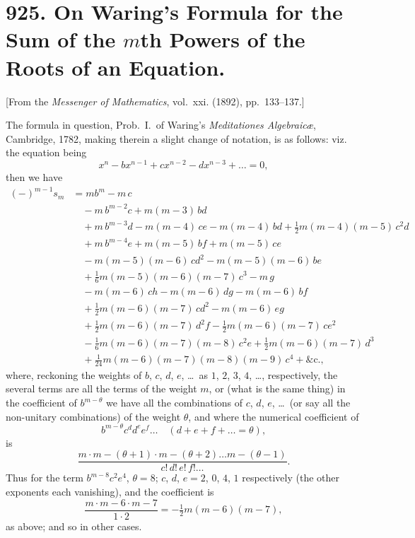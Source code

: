 \documentclass[11pt,a4paper]{book}
\begin{document}
\newpage
\section*{925. On Waring's Formula for the Sum of the $m$th Powers of the Roots of an Equation.}

[From the \textit{Messenger of Mathematics}, vol.~xxi. (1892), pp.~133--137.]

\bigskip

The formula in question, Prob.~I.~of Waring's \textit{Meditationes Algebraic\ae}, Cambridge,
1782, making therein a slight change of notation, is as follows: viz. the equation being
\[
x^n - bx^{n-1} + cx^{n-2} - dx^{n-3} + \ldots = 0,
\]
then we have
\begin{align*}
(-)^{m-1} s_m &= mb^m - m\,c\\
&\quad - m\,b^{m-2}c + m(m-3)\,bd\\
&\quad + m\,b^{m-3}d - m(m-4)\,ce - m(m-4)\,bd + \tfrac{1}{2}m(m-4)(m-5)\,c^2d\\
&\quad + m\,b^{m-4}e + m(m-5)\,bf + m(m-5)\,ce\\
&\quad - m(m-5)(m-6)\,cd^2 - m(m-5)(m-6)\,be\\
&\quad + \tfrac{1}{6}m(m-5)(m-6)(m-7)\,c^3 - m\,g\\
&\quad - m(m-6)\,ch - m(m-6)\,dg - m(m-6)\,bf\\
&\quad + \tfrac{1}{2}m(m-6)(m-7)\,cd^2 - m(m-6)\,eg\\
&\quad + \tfrac{1}{2}m(m-6)(m-7)\,d^2f - \tfrac{1}{2}m(m-6)(m-7)\,ce^2\\
&\quad - \tfrac{1}{6}m(m-6)(m-7)(m-8)\,c^2e + \tfrac{1}{2}m(m-6)(m-7)\,d^3\\
&\quad + \tfrac{1}{24}m(m-6)(m-7)(m-8)(m-9)\,c^4 + \&\text{c.},
\end{align*}
where, reckoning the weights of $b$, $c$, $d$, $e$, \ldots\ as $1$, $2$, $3$, $4$, \ldots, respectively, the several
terms are all the terms of the weight $m$, or (what is the same thing) in the
coefficient of $b^{m-\theta}$ we have all the combinations of $c$, $d$, $e$, \ldots\ (or say all the
non-unitary combinations) of the weight $\theta$, and where the numerical coefficient of
\[
b^{m-\theta} c^d d^e e^f \ldots \quad (d + e + f + \ldots = \theta),
\]
is
\[
\frac{m \cdot m - (\theta + 1) \cdot m - (\theta + 2) \ldots m - (\theta - 1)}{c!\,d!\,e!\,f!\ldots}.
\]
Thus for the term $b^{m-8}c^2e^4$, $\theta = 8$; $c$, $d$, $e = 2$, $0$, $4$, $1$ respectively (the other exponents
each vanishing), and the coefficient is
\[
\frac{m \cdot m-6 \cdot m-7}{1 \cdot 2} = -\tfrac{1}{2}m(m-6)(m-7),
\]
as above; and so in other cases.
\end{document}
